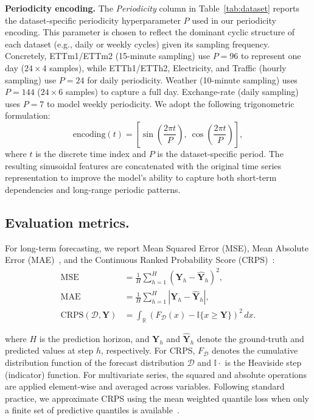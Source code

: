 \noindent\textbf{Periodicity encoding.}
The \textit{Periodicity} column in Table~\ref{tab:dataset} reports the dataset-specific periodicity hyperparameter $P$ used in our periodicity encoding. This parameter is chosen to reflect the dominant cyclic structure of each dataset (e.g., daily or weekly cycles) given its sampling frequency. Concretely, ETTm1/ETTm2 (15-minute sampling) use $P=96$ to represent one day ($24\times4$ samples), while ETTh1/ETTh2, Electricity, and Traffic (hourly sampling) use $P=24$ for daily periodicity. Weather (10-minute sampling) uses $P=144$ ($24\times6$ samples) to capture a full day. Exchange-rate (daily sampling) uses $P=7$ to model weekly periodicity. We adopt the following trigonometric formulation:
\begin{equation}
  \text{encoding}(t)=\left[\sin\left(\frac{2\pi t}{P}\right),\ \cos\left(\frac{2\pi t}{P}\right)\right],
\end{equation}
where $t$ is the discrete time index and $P$ is the dataset-specific period. The resulting sinusoidal features are concatenated with the original time series representation to improve the model’s ability to capture both short-term dependencies and long-range periodic patterns.

\subsection{Evaluation metrics.}
For long-term forecasting, we report Mean Squared Error (MSE), Mean Absolute Error (MAE)~\cite{hyndman2006another}, and the Continuous Ranked Probability Score (CRPS)~\cite{gneiting2007strictly}:
\begin{align}
\text{MSE} &= \frac{1}{H}\sum_{h=1}^{H} \left(\mathbf{Y}_{h}-\hat{\mathbf{Y}}_{h}\right)^2, \label{equ:mse}\\
\text{MAE} &= \frac{1}{H}\sum_{h=1}^{H}\left|\mathbf{Y}_{h}-\hat{\mathbf{Y}}_{h}\right|, \label{equ:mae}\\
\text{CRPS}(\mathcal{D},\mathbf{Y}) &= \int_{\mathbb{R}} \left(F_{\mathcal{D}}(x) - \mathbb{I}\{x \ge \mathbf{Y}\}\right)^2 \, dx. \label{equ:crps}
\end{align}


where $H$ is the prediction horizon, and $\mathbf{Y}_{h}$ and $\hat{\mathbf{Y}}_{h}$ denote the ground-truth and predicted values at step $h$, respectively. For CRPS, $F_{\mathcal{D}}$ denotes the cumulative distribution function of the forecast distribution $\mathcal{D}$ and $\mathbb{I}{\cdot}$ is the Heaviside step (indicator) function. For multivariate series, the squared and absolute operations are applied element-wise and averaged across variables. Following standard practice, we approximate CRPS using the mean weighted quantile loss when only a finite set of predictive quantiles is available~\cite{park2022learning}.


